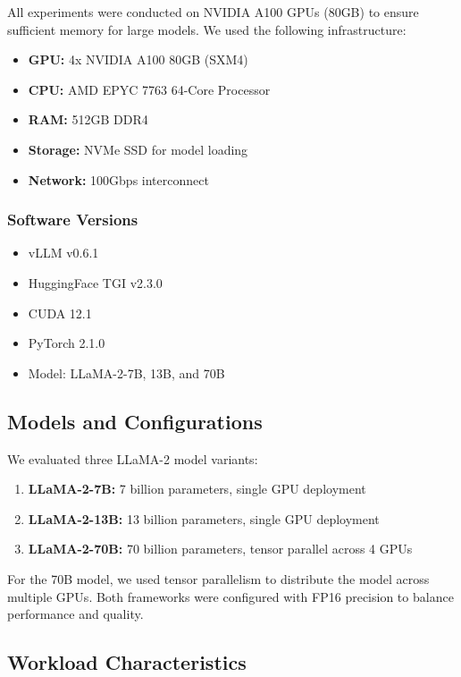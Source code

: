\documentclass{article}
\begin{document}
All experiments were conducted on NVIDIA A100 GPUs (80GB) to ensure sufficient memory for large models. We used the following infrastructure:

\begin{itemize}
    \item \textbf{GPU:} 4x NVIDIA A100 80GB (SXM4)
    \item \textbf{CPU:} AMD EPYC 7763 64-Core Processor
    \item \textbf{RAM:} 512GB DDR4
    \item \textbf{Storage:} NVMe SSD for model loading
    \item \textbf{Network:} 100Gbps interconnect
\end{itemize}

\subsubsection{Software Versions}

\begin{itemize}
    \item vLLM v0.6.1
    \item HuggingFace TGI v2.3.0
    \item CUDA 12.1
    \item PyTorch 2.1.0
    \item Model: LLaMA-2-7B, 13B, and 70B
\end{itemize}

\subsection{Models and Configurations}

We evaluated three LLaMA-2 model variants:

\begin{enumerate}
    \item \textbf{LLaMA-2-7B:} 7 billion parameters, single GPU deployment
    \item \textbf{LLaMA-2-13B:} 13 billion parameters, single GPU deployment  
    \item \textbf{LLaMA-2-70B:} 70 billion parameters, tensor parallel across 4 GPUs
\end{enumerate}

For the 70B model, we used tensor parallelism to distribute the model across multiple GPUs. Both frameworks were configured with FP16 precision to balance performance and quality.

\subsection{Workload Characteristics}
\end{document}
